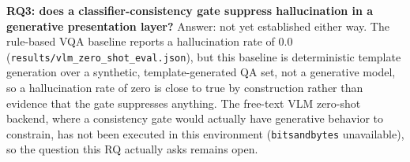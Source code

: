 \textbf{RQ3: does a classifier-consistency gate suppress hallucination in a generative presentation layer?} Answer: not yet established either way. The rule-based VQA baseline reports a hallucination rate of 0.0 (\texttt{results/vlm\_zero\_shot\_eval.json}), but this baseline is deterministic template generation over a synthetic, template-generated QA set, not a generative model, so a hallucination rate of zero is close to true by construction rather than evidence that the gate suppresses anything. The free-text VLM zero-shot backend, where a consistency gate would actually have generative behavior to constrain, has not been executed in this environment (\texttt{bitsandbytes} unavailable), so the question this RQ actually asks remains open.
